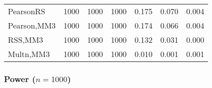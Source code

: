 \documentclass[
]{article}
\begin{document}
\begin{table}[H]
{\begin{tabular}[t]{lrrrrrr}
\hspace{1em}PearsonRS & 1000 & 1000 & 1000 & 0.175 & 0.070 & 0.004\\
\hspace{1em}Pearson,MM3 & 1000 & 1000 & 1000 & 0.174 & 0.066 & 0.004\\
\hspace{1em}RSS,MM3 & 1000 & 1000 & 1000 & 0.132 & 0.031 & 0.000\\
\hspace{1em}Multn,MM3 & 1000 & 1000 & 1000 & 0.010 & 0.001 & 0.001\\
\bottomrule
\end{tabular}}
\end{table}

\hypertarget{power-n1000-2}{%
\subsubsection{\texorpdfstring{Power
(\(n=1000\))}{Power (n=1000)}}\label{power-n1000-2}}
\end{document}
